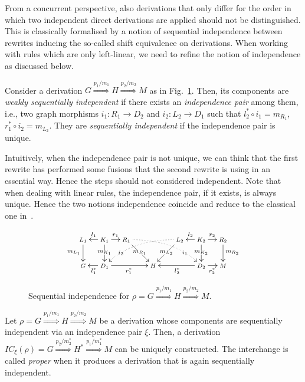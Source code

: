 \documentclass[conference]{IEEEtran}
\newcommand{\Rrel}[1]   {\stackrel{{#1}}{\Longrightarrow}}
\begin{document}
From a concurrent perspective, also derivations that only differ for
the order in which two independent direct derivations are applied
should not be distinguished. This is classically formalised by a
notion of sequential independence between rewrites inducing the
so-called shift equivalence on derivations. When working with rules
which are only left-linear, we need to refine the notion of
independence as discussed below.


\begin{definition}
  \label{de:seq-ind}
  Consider a derivation $G \Rrel{p_1/m_1} H \Rrel{p_2/m_2} M$ as in
  Fig.~\ref{fi:strongseq}. Then, its components are \emph{weakly sequentially
    independent} if there exists an \emph{independence pair} among
  them, i.e., two graph morphisms $i_1: R_1 \rightarrow D_2$ and
  $i_2: L_2 \rightarrow D_1$ such that $l_2^* \circ i_1 = m_{R_1}$,
  $r_1^* \circ i_2 = m_{L_2}$.
  They are \emph{sequentially
    independent} if the independence pair is unique.
\end{definition}

Intuitively, when the independence pair is not unique, we can think
that the first rewrite has performed some fusions that the second
rewrite is using in an essential way. Hence the steps should not
considered independent.
%
Note that when dealing with linear rules, the independence pair, if it exists,
is always unique. Hence the two notions independence coincide and
reduce to the classical one in~\cite{CMREHL:AAGT}.


\begin{figure}[t]
\[
\def\objectstyle{\scriptstyle}\def\labelstyle{\scriptstyle}
\xymatrix@C=0.7mm@R=7mm{
  {L_1} \ar[d]_{m_{L_1}}
        & & {K_1} \ar[ll]_{l_1} \ar[rr]^{r_1} \ar[d]|{m_{K_1}}
        & & {R_1} \ar[drrr]|{m_{R_1}}  \ar@(r,ul)@{.>}|(.75){i_1}[drrrrrrrr]
        & & & & & &
  {L_2}\ar[dlll]|{m_{L_2}} \ar@(l,ur)@{.>}|(.75){i_2}[dllllllll]
        & & {K_2} \ar[ll]_{l_2} \ar[rr]^{r_2} \ar[d]|{m_{K_2}}
        & & {R_2} \ar[d]^{m_{R_2}} \\
    {G}
     & & {D_1} \ar[ll]^{l^*_1} \ar[rrrrr]_{r^*_1}
     & & & &  & {H} & &
     & & & {D_2} \ar[lllll]^{l^*_2} \ar[rr]_{r^*_2}
     & & {M}  }
\]
\caption{Sequential independence for
  $\rho = G \Rrel{p_1/m_1} H \Rrel{p_2/m_2} M$.}
\label{fi:strongseq}
\end{figure}


\begin{proposition}
  \label{pr:interchangeEG}
  Let $\rho = {G} \Rrel{p_1/m_1} {H} \Rrel{p_2/m_2} {M}$ be a
  derivation whose components are sequentially independent via
  an independence pair $\xi$.
  Then, a derivation $IC_\xi(\rho) = {G} \Rrel{p_2/m^*_2}
  {H^*} \Rrel{p_1/m^*_1} {M}$ can be uniquely constructed.
  The interchange is called \emph{proper} when it produces a
  derivation that is again sequentially independent.
\end{proposition}
\end{document}
